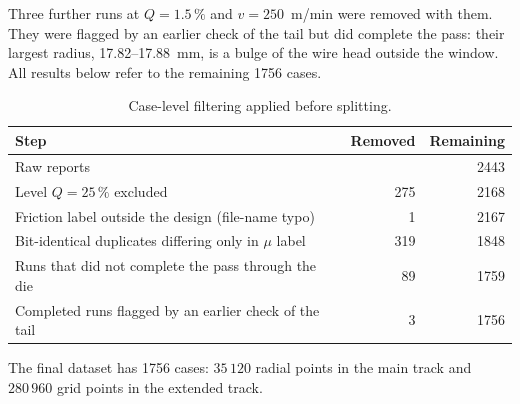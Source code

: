 \documentclass[subscriptcorrection,upint,varvw,barcolor=Goldenrod3,mathalfa=cal=euler,balance,hyphenate,french,pdf-a]{asmejour} %
\begin{document}
Three further runs at $Q=1.5\,\%$ and $v=250$~m/min were removed with them. They were flagged by an earlier check of the tail but did complete the pass: their largest radius, 17.82--17.88~mm, is a bulge of the wire head outside the window. All results below refer to the remaining 1756 cases.

\begin{table}[htbp]
\centering\small
\caption{Case-level filtering applied before splitting.}
\label{tab:filtering}
\begin{tabular}{@{}lrr@{}}
\toprule
Step & Removed & Remaining \\
\midrule
Raw reports                                            &     & 2443 \\ %
Level $Q=25\,\%$ excluded                                & 275 & 2168 \\ %
Friction label outside the design (file-name typo)     & 1   & 2167 \\ %
Bit-identical duplicates differing only in $\mu$ label & 319 & 1848 \\ %
Runs that did not complete the pass through the die    & 89  & 1759 \\ %
Completed runs flagged by an earlier check of the tail & 3   & 1756 \\ %
\bottomrule
\end{tabular}
\end{table}

The final dataset has 1756 cases: $35\,120$ radial points in the main track and $280\,960$ grid points in the extended track. %
\end{document}
